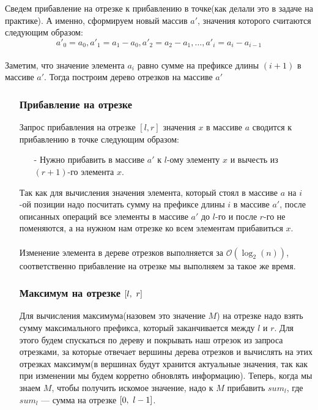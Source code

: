 \documentclass{article}
\begin{document}
Сведем прибавление на отрезке к прибавлению в точке(как делали это в задаче на практике). А именно, сформируем новый массив $a'$, значения которого считаются следующим образом: $$a'_0 = a_0, a'_1 = a_1 - a_0, a'_2 = a_2 - a_1, \ldots,  a'_i = a_i - a_{i - 1}$$ \\
Заметим, что значение элемента $a_i$ равно сумме на префиксе длины $(i + 1)$ в массиве $a'$. Тогда построим дерево отрезков на массиве $a'$
\begin{enumerate}
	\item[\RomanNumeralCaps{1}]
	\subsubsection*{Прибавление на отрезке}
	Запрос прибавления на отрезке $[l, r]$ значения $x$ в массиве $a$ сводится к прибавлению в точке следующим образом:
	
	\begin{itemize}
		\item[-] 
		Нужно прибавить в массиве $a'$ к $l$-ому элементу $x$   
		и вычесть из $(r + 1)$-го элемента $x$.
	\end{itemize}
	Так как для вычисления значения элемента, который стоял в массиве $a$ на $i$-ой позиции надо посчитать сумму на префиксе длины $i$ в массиве $a'$, после описанных операций все элементы в массиве $a'$ до $l$-го и после $r$-го не поменяются, а на нужном нам отрезке ко всем элементам прибавиться $x$.
	\\\\
	Изменение элемента в дереве отрезков выполняется за 
	$\mathcal{O}(\log_{2}(n))$, соответственно прибавление на отрезке мы выполняем за такое же время.
	\item[\RomanNumeralCaps{2}]
	\subsubsection*{Максимум на отрезке $[l, \text{\space}r]$}


	Для вычисления максимума(назовем это значение $M$) на отрезке надо взять сумму максимального префикса, который заканчивается между $l$ и $r$. Для этого будем спускаться по дереву и покрывать наш отрезок из запроса отрезками, за которые отвечает вершины дерева отрезков и вычислять на этих отрезках максимум(в вершинах будут хранится актуальные значения, так как при изменении мы будем корретно обновлять информацию). Теперь, когда мы знаем $M$, чтобы получить искомое значение, надо к $M$ прибавить $sum_l$, где $sum_l$ --- сумма на отрезке $[0, \text{\space} l - 1]$. 
	

\end{enumerate}
\end{document}
